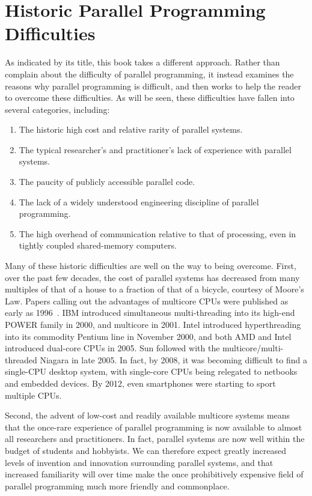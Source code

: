 \section{Historic Parallel Programming Difficulties}
\label{sec:intro:Historic Parallel Programming Difficulties}

As indicated by its title, this book takes a different approach.
Rather than complain about the difficulty of parallel programming,
it instead examines the reasons why parallel programming is
difficult, and then works to help the reader to overcome these
difficulties.
As will be seen, these difficulties have fallen into several categories,
including:

\begin{enumerate}
\item	The historic high cost and relative rarity of parallel systems.
\item	The typical researcher's and practitioner's lack of experience
	with parallel systems.
\item	The paucity of publicly accessible parallel code.
\item	The lack of a widely understood engineering discipline of
	parallel programming.
\item	The high overhead of communication relative to that of processing,
	even in tightly coupled shared-memory computers.
\end{enumerate}

Many of these historic difficulties are well on the way to being overcome.
First, over the past few decades, the cost of parallel systems
has decreased from many multiples of that of a house to a fraction of
that of a bicycle, courtesy of Moore's Law.
Papers calling out the advantages of multicore CPUs were published
as early as 1996~\cite{Olukotun96}.
IBM introduced simultaneous multi-threading
into its high-end POWER family in 2000, and multicore in 2001.
Intel introduced hyperthreading into its commodity Pentium line in
November 2000, and both AMD and Intel introduced
dual-core CPUs in 2005.
Sun followed with the multicore/multi-threaded Niagara in late 2005.
In fact, by 2008, it was becoming difficult
to find a single-CPU desktop system, with single-core CPUs being
relegated to netbooks and embedded devices.
By 2012, even smartphones were starting to sport multiple CPUs.

Second, the advent of low-cost and readily available multicore systems
means that the once-rare experience of parallel programming is
now available to almost all researchers and practitioners.
In fact, parallel systems are now well within the budget of students
and hobbyists.
We can therefore expect greatly increased levels of invention and
innovation surrounding parallel systems, and that increased familiarity
will over time make the once prohibitively expensive field of parallel
programming much more friendly and commonplace.

